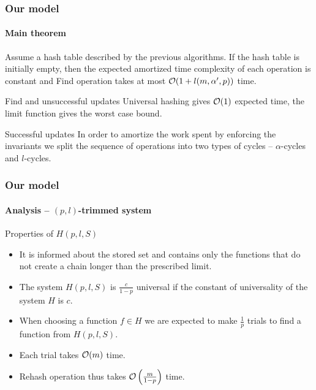\begin{frame}
	\frametitle{Our model}
	\framesubtitle{Main theorem}
	
	\begin{theorem}
	Assume a hash table described by the previous algorithms.
	If the hash table is initially empty, then the expected amortized time complexity of each operation is constant and Find operation takes at most $\mathcal{O}(1 + l(m, \alpha', p))$ time.
	\end{theorem}
	
	\begin{block}{Find and unsuccessful updates}
		Universal hashing gives $\mathcal{O}(1)$ expected time, the limit function gives the worst case bound.
	\end{block}
	
	\begin{block}{Successful updates}
		In order to amortize the work spent by enforcing the invariants we split the sequence of operations into two types of cycles -- $\alpha$-cycles and $l$-cycles.
	\end{block}
\end{frame}

\begin{frame}
	\frametitle{Our model}
	\framesubtitle{Analysis -- $(p, l)$-trimmed system}
	
	\begin{block}{Properties of $H(p, l, S)$}
		\begin{itemize}
			\item It is informed about the stored set and contains only the functions that do not create a chain longer than the prescribed limit.
			\item The system $H(p, l, S)$ is $\frac{c}{1 - p}$ universal if the constant of universality of the system $H$ is $c$.
			\item When choosing a function $f \in H$ we are expected to make $\frac{1}{p}$ trials to find a function from $H(p, l, S)$.
			\item Each trial takes $\mathcal{O}(m)$ time. 
			\item Rehash operation thus takes $\mathcal{O}\left(\frac{m}{1 - p}\right)$ time.
		\end{itemize}
	\end{block}
\end{frame}

